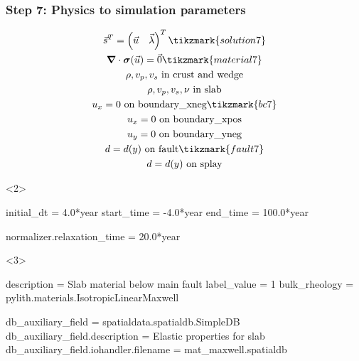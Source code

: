 \documentclass[aspectratio=169]{beamer}
\begin{document}
\begin{frame}[t,fragile]
  \frametitle{Step 7: Physics to simulation parameters}
  \summary{}

  \begin{minipage}[t]{0.3\textwidth}
    {\scriptsize
    \begin{gather*}
    \vec{s}^T = \left( \vec{u} \quad \vec{\lambda} \right)^T \tikzmark{solution7}\\
    \tensor{\nabla} \cdot \tensor{\sigma}(\vec{u}) = \vec{0} \tikzmark{material7}\\
    \rho, v_p, v_s \text{ in crust and wedge} \\
    \rho, v_p, v_s, \nu  \text{ in slab} \\
    u_x = 0 \text{ on boundary\_xneg} \tikzmark{bc7}\\
    u_x = 0 \text{ on boundary\_xpos} \\
    u_y = 0 \text{ on boundary\_yneg} \\
    d = d(y) \text{ on fault} \tikzmark{fault7} \\
    d = d(y) \text{ on splay}
    \end{gather*}}
  \end{minipage}
  \hfill
  \begin{minipage}[t]{0.67\textwidth}
    \begin{onlyenv}<2>
      \begin{cfgcode}
        initial_dt = 4.0*year
        start_time = -4.0*year
        end_time = 100.0*year

        normalizer.relaxation_time = 20.0*year
      \end{cfgcode}
    \end{onlyenv}
    \begin{onlyenv}<3>
      \begin{cfgcode}
        description = Slab material below main fault
        label_value = 1
        bulk_rheology = pylith.materials.IsotropicLinearMaxwell

        db_auxiliary_field = spatialdata.spatialdb.SimpleDB
        db_auxiliary_field.description = Elastic properties for slab
        db_auxiliary_field.iohandler.filename = mat_maxwell.spatialdb


\end{cfgcode}
\end{onlyenv}
\end{minipage}
\end{frame}
\end{document}
